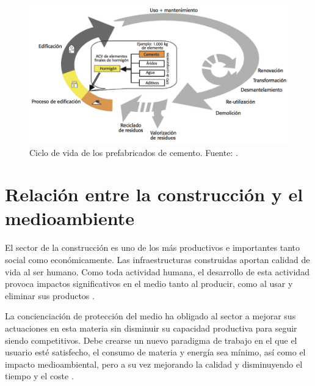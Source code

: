 \begin{figure}[!htb]
\centering
\includegraphics[width=12cm]{img/ciclodevida.png}
\caption[Ciclo de vida de los prefabricados de cemento.]{Ciclo de vida de los prefabricados de cemento. Fuente: \cite{oficemen}.}
\label{fig:ciclodevidaprefabric}
\end{figure}

\section{Relación entre la construcción y el medioambiente}
El sector de la construcción es uno de los más productivos e importantes tanto social como económicamente. Las infraestructuras construidas aportan calidad de vida al ser humano. Como toda actividad humana, el desarrollo de esta actividad provoca impactos significativos en el medio tanto al producir, como al usar y eliminar sus productos \cite{carvalho}.

La concienciación de protección del medio ha obligado al sector a mejorar sus actuaciones en esta materia sin disminuir su capacidad productiva para seguir siendo competitivos. Debe crearse un nuevo paradigma de trabajo en el que el usuario esté satisfecho, el consumo de materia y energía sea mínimo, así como el impacto medioambiental, pero a su vez mejorando la calidad y disminuyendo el tiempo y el coste \cite{augenbroe}.

